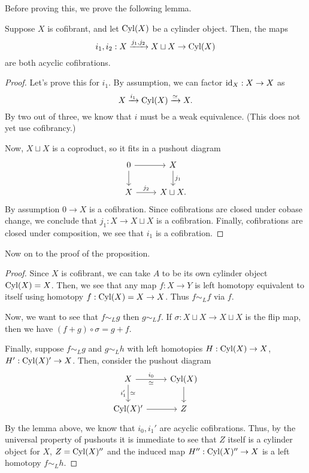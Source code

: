 \documentclass[11pt]{amsart}
\def\Cyl{{\rm Cyl}}
\begin{document}
Before proving this, we prove the following lemma. 
\begin{lem}
Suppose $X$ is cofibrant, and let $\Cyl(X)$ be a cylinder object. 
Then, the maps
\[
i_1, i_2 : X \xto{j_1,j_2} X \sqcup X \to \Cyl(X)
\]
are both acyclic cofibrations. 
\end{lem}
\begin{proof}
Let's prove this for $i_1$. 
By assumption, we can factor ${\rm id}_X : X \to X$ as
\[
X \xto{i_1} \Cyl(X) \xto{\simeq} X .
\] 
By two out of three, we know that $i$ must be a weak equivalence. (This does not yet use cofibrancy.)

Now, $X \sqcup X$ is a coproduct, so it fits in a pushout diagram
\[
\begin{tikzcd}
0 \ar[r] \ar[d] & X \ar[d, "j_1"] \\
X \ar[r,"j_2"] & X \sqcup X .
\end{tikzcd}
\]
By assumption $0 \to X$ is a cofibration.
Since cofibrations are closed under cobase change, we conclude that $j_1 : X \to X \sqcup X$ is a cofibration. 
Finally, cofibrations are closed under composition, we see that $i_1$ is a cofibration. 
\end{proof}

Now on to the proof of the proposition. 

\begin{proof}
Since $X$ is cofibrant, we can take $A$ to be its own cylinder object ${\rm Cyl}(X) = X$. 
Then, we see that any map $f : X \to Y$ is left homotopy equivalent to itself using homotopy $f : \Cyl(X) = X \to X$. 
Thus $f \sim_L f$ via $f$. 

Now, we want to see that $f \sim_L g$ then $g \sim_L f$. 
If $\sigma : X \sqcup X \to X \sqcup X$ is the flip map, then we have $(f + g) \circ \sigma = g + f$. 

Finally, suppose $f \sim_L g$ and $g \sim_L h$ with left homotopies $H : \Cyl(X) \to X$, $H' : \Cyl(X)' \to X$. 
Then, consider the pushout diagram
\[
\begin{tikzcd}
X \ar[r,"i_0", "\simeq"'] \ar[d, "i_1'"', "\simeq"] & \Cyl(X) \ar[d] \\
\Cyl(X)' \ar[r] & Z
\end{tikzcd}
\]
By the lemma above, we know that $i_0, i_1'$ are acyclic cofibrations. 
Thus, by the universal property of pushouts it is immediate to see that $Z$ itself is a cylinder object for $X$, $Z = \Cyl(X)''$ and the induced map $H'' : \Cyl(X)''\to X$ is a left homotopy $f \sim_L h$. 

\end{proof}
\end{document}
